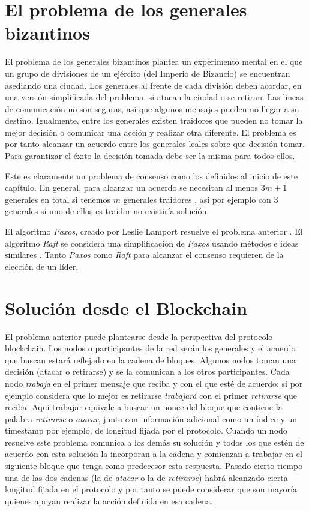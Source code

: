 \section{El problema de los generales bizantinos}
El problema de los generales bizantinos \citep{byzantine_generals} plantea un experimento mental en el que un grupo de divisiones de un ejército (del Imperio de Bizancio) se encuentran asediando una ciudad. Los generales al frente de cada división deben acordar, en una versión simplificada del problema, si atacan la ciudad o se retiran. Las líneas de comunicación no son seguras, así que algunos mensajes pueden no llegar a su destino. Igualmente, entre los generales existen traidores que pueden no tomar la mejor decisión o comunicar una acción y realizar otra diferente.
El problema es por tanto alcanzar un acuerdo entre los generales leales sobre que decisión tomar. Para garantizar el éxito la decisión tomada debe ser la misma para todos ellos.

Este es claramente un problema de consenso como los definidos al inicio de este capítulo. En general, para alcanzar un acuerdo se necesitan al menos $3m+1$ generales en total si tenemos $m$ generales traidores \citep{byzantine_generals}, así por ejemplo con 3 generales si uno de ellos es traidor no existiría solución.

El algoritmo \textit{Paxos}, creado por  Leslie Lamport resuelve el problema anterior \citep{paxos}. El algoritmo \textit{Raft} se considera una simplificación de \textit{Paxos} usando métodos e ideas similares \citep{raft}. Tanto \textit{Paxos} como \textit{Raft} para alcanzar el consenso requieren de la elección de un líder.

\section{Solución desde el Blockchain}
El problema anterior puede plantearse desde la perspectiva del protocolo blockchain. Los nodos o participantes de la red serán los generales y el acuerdo que buscan estará reflejado en la cadena de bloques. Algunos nodos toman una decisión (atacar o retirarse) y se la comunican a los otros participantes. Cada nodo \textit{trabaja} en el primer mensaje que reciba y con el que esté de acuerdo: si por ejemplo considera que lo mejor es retirarse \textit{trabajará} con el primer \textit{retirarse} que reciba. Aquí trabajar equivale a buscar un nonce del bloque que contiene la palabra \textit{retirarse} o \textit{atacar}, junto con información adicional como un índice y un timestamp por ejemplo, de longitud fijada por el protocolo. 
Cuando un nodo resuelve este problema comunica a los demás su solución y todos los que estén de acuerdo con esta solución la incorporan a la cadena y comienzan a trabajar en el siguiente bloque que tenga como predecesor esta respuesta. Pasado cierto tiempo una de las dos cadenas (la de \textit{atacar} o la de \textit{retirarse}) habrá alcanzado cierta longitud fijada en el protocolo y por tanto se puede considerar que son mayoría quienes apoyan realizar la acción definida en esa cadena.

